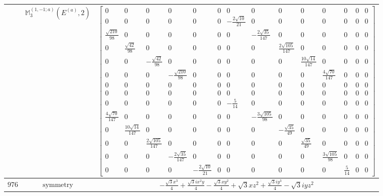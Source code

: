 \documentclass[fleqn,8pt,landscape]{jsarticle}
\begin{document}
\begin{longtable}{ccc}
$  $ & $ \mathbb{M}_{3}^{(1,-1;a)}(E^{(a)},2) $ & $ \begin{bmatrix} 0 & 0 & 0 & 0 & 0 & 0 & 0 & 0 & 0 & 0 & 0 & 0 & 0 & 0 \\ 0 & 0 & 0 & 0 & 0 & 0 & - \frac{2 \sqrt{10}}{21} & 0 & 0 & 0 & 0 & 0 & 0 & 0 \\ \frac{\sqrt{210}}{98} & 0 & 0 & 0 & 0 & 0 & 0 & - \frac{2 \sqrt{35}}{147} & 0 & 0 & 0 & 0 & 0 & 0 \\ 0 & \frac{\sqrt{42}}{98} & 0 & 0 & 0 & 0 & 0 & 0 & \frac{2 \sqrt{105}}{147} & 0 & 0 & 0 & 0 & 0 \\ 0 & 0 & - \frac{\sqrt{42}}{98} & 0 & 0 & 0 & 0 & 0 & 0 & \frac{10 \sqrt{14}}{147} & 0 & 0 & 0 & 0 \\ 0 & 0 & 0 & - \frac{\sqrt{210}}{98} & 0 & 0 & 0 & 0 & 0 & 0 & \frac{4 \sqrt{70}}{147} & 0 & 0 & 0 \\ 0 & 0 & 0 & 0 & 0 & 0 & 0 & 0 & 0 & 0 & 0 & 0 & 0 & 0 \\ 0 & 0 & 0 & 0 & 0 & 0 & 0 & 0 & 0 & 0 & 0 & 0 & 0 & 0 \\ 0 & 0 & 0 & 0 & 0 & 0 & - \frac{5}{14} & 0 & 0 & 0 & 0 & 0 & 0 & 0 \\ \frac{4 \sqrt{70}}{147} & 0 & 0 & 0 & 0 & 0 & 0 & - \frac{3 \sqrt{105}}{98} & 0 & 0 & 0 & 0 & 0 & 0 \\ 0 & \frac{10 \sqrt{14}}{147} & 0 & 0 & 0 & 0 & 0 & 0 & - \frac{\sqrt{35}}{49} & 0 & 0 & 0 & 0 & 0 \\ 0 & 0 & \frac{2 \sqrt{105}}{147} & 0 & 0 & 0 & 0 & 0 & 0 & \frac{\sqrt{35}}{49} & 0 & 0 & 0 & 0 \\ 0 & 0 & 0 & - \frac{2 \sqrt{35}}{147} & 0 & 0 & 0 & 0 & 0 & 0 & \frac{3 \sqrt{105}}{98} & 0 & 0 & 0 \\ 0 & 0 & 0 & 0 & - \frac{2 \sqrt{10}}{21} & 0 & 0 & 0 & 0 & 0 & 0 & \frac{5}{14} & 0 & 0 \end{bmatrix} $ \\ \hline
$ 976 $ & $ \text{symmetry} $ & $ - \frac{\sqrt{3} x^{3}}{4} + \frac{\sqrt{3} i x^{2} y}{4} - \frac{\sqrt{3} x y^{2}}{4} + \sqrt{3} x z^{2} + \frac{\sqrt{3} i y^{3}}{4} - \sqrt{3} i y z^{2} $ \\

\end{longtable}
\end{document}
